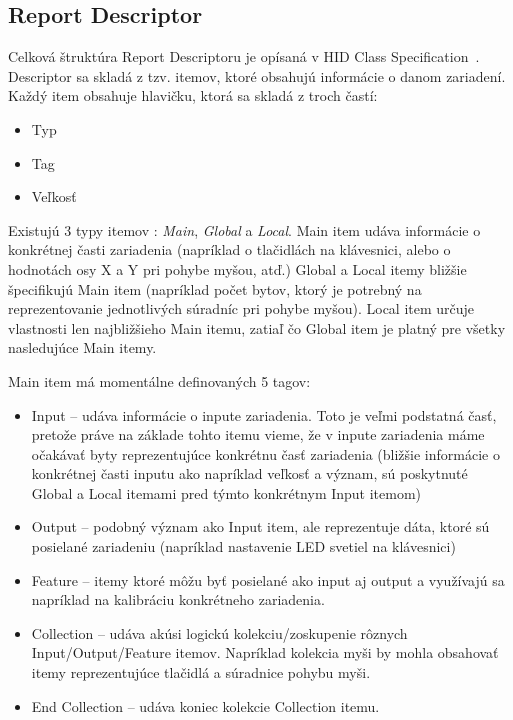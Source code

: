 \subsection*{Report Descriptor}
\label{kap03:sec:report_desc}
Celková štruktúra Report Descriptoru je opísaná v HID Class Specification~\cite{report_desc}. Descriptor sa skladá z tzv. itemov, ktoré obsahujú informácie o danom zariadení. Každý item obsahuje hlavičku, ktorá sa skladá z troch častí:
\begin{itemize}
\item Typ
\item Tag
\item Veľkosť
\end{itemize}

Existujú 3 typy itemov : \textit{Main}, \textit{Global} a \textit{Local}. Main item udáva informácie o konkrétnej časti zariadenia (napríklad o tlačidlách na klávesnici, alebo o hodnotách osy X a Y pri pohybe myšou, atď.) Global a Local itemy bližšie špecifikujú Main item (napríklad počet bytov, ktorý je potrebný na reprezentovanie jednotlivých súradníc pri pohybe myšou). Local item určuje vlastnosti len najbližšieho Main itemu, zatiaľ čo Global item je platný pre všetky nasledujúce Main itemy.

Main item má momentálne definovaných 5 tagov:
\begin{itemize}
\item Input -- udáva informácie o inpute zariadenia. Toto je veľmi podstatná časť, pretože práve na základe tohto itemu vieme, že v inpute zariadenia máme očakávať byty reprezentujúce konkrétnu časť zariadenia (bližšie informácie o konkrétnej časti inputu ako napríklad veľkosť a význam, sú poskytnuté Global a Local itemami pred týmto konkrétnym Input itemom)
\item Output -- podobný význam ako Input item, ale reprezentuje dáta, ktoré sú posielané zariadeniu (napríklad nastavenie LED svetiel na klávesnici)
\item Feature -- itemy ktoré môžu byť posielané ako input aj output a využívajú sa napríklad na kalibráciu konkrétneho zariadenia.
\item Collection -- udáva akúsi logickú kolekciu/zoskupenie rôznych Input/Output/Feature itemov. Napríklad kolekcia myši by mohla obsahovať itemy reprezentujúce tlačidlá a súradnice pohybu myši.
\item End Collection -- udáva koniec kolekcie Collection itemu.
\end{itemize}

